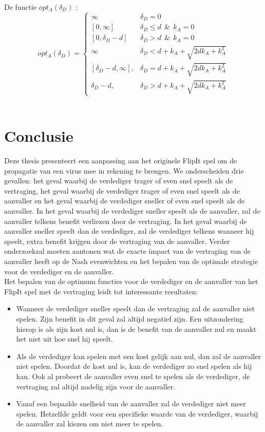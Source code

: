 \documentclass[master=cws, masteroption=vs,english]{kulemt}
\begin{document}
\begin{abstract*}
De functie $opt_{A}(\delta_{D})$ :
 \begin{displaymath}
  opt_{A}(\delta_{D}) = \left\{
     \begin{array}{lr}
     \infty & \delta_{D} = 0 \\
     \left[0,\infty\right] & \delta_{D} \leq d ~~\& ~~k_{A}=0 \\
          \left[0,\delta_{D} - d\right] & \delta_{D} > d ~~\& ~~k_{A}=0 \\
            \infty & \delta_{D} < d+k_{A} + \sqrt{2dk_{A}+k_{A}^{2}} \\
       \left[ \delta_{D}-d, \infty\right],  & \delta_{D} = d+k_{A} + \sqrt{2dk_{A}+k_{A}^{2}} \\
    	\delta_{D}-d, & \delta_{D} > d+k_{A} + \sqrt{2dk_{A}+k_{A}^{2}}
     \end{array}
   \right.
\end{displaymath}
\\
\section{Conclusie}
\label{ch:conclusion}
Deze thesis presenteert een aanpassing aan het originele FlipIt spel \citep{FlipIt} om de propagatie van een virus mee in rekening te brengen. We onderscheiden drie gevallen: het geval waarbij de verdediger trager of even snel speelt als de vertraging, het geval waarbij de verdediger trager of even snel speelt als de aanvaller en het geval waarbij de verdediger sneller of even snel speelt als de aanvaller. In het geval waarbij de verdediger sneller speelt als de aanvaller, zal de aanvaller telkens benefit verliezen door de vertraging. In het geval waarbij de aanvaller sneller speelt dan de verdediger, zal de verdediger telkens wanneer hij speelt, extra benefit krijgen door de vertraging van de aanvaller. Verder onderzoekzal moeten aantonen wat de exacte impact van de vertraging van de aanvaller heeft op de Nash evenwichten en het bepalen van de optimale strategie voor de verdediger en de aanvaller.\\

Het bepalen van de optimum functies voor de verdediger en de aanvaller van het FlipIt spel met de vertraging leidt tot interessante resultaten: 
\begin{itemize}
\item Wanneer de verdediger sneller speelt dan de vertraging zal de aanvaller niet spelen. Zijn benefit in dit geval zal altijd negatief zijn. Een uitzondering hierop is als zijn kost nul is, dan is de benefit van de aanvaller nul en maakt het niet uit hoe snel hij speelt.
\item Als de verdediger kan spelen met een kost gelijk aan nul, dan zal de aanvaller niet spelen. Doordat de kost nul is, kan de verdediger zo snel spelen als hij kan. Ook al probeert de aanvaller even snel te spelen als de verdediger, de vertraging zal altijd nadelig zijn voor de aanvaller. 
\item Vanaf een bepaalde snelheid van de aanvaller zal de verdediger niet meer spelen. Hetzelfde geldt voor een specifieke waarde van de verdediger, waarbij de aanvaller zal kiezen om niet meer te spelen.
\end{itemize}


\end{abstract*}
\end{document}
